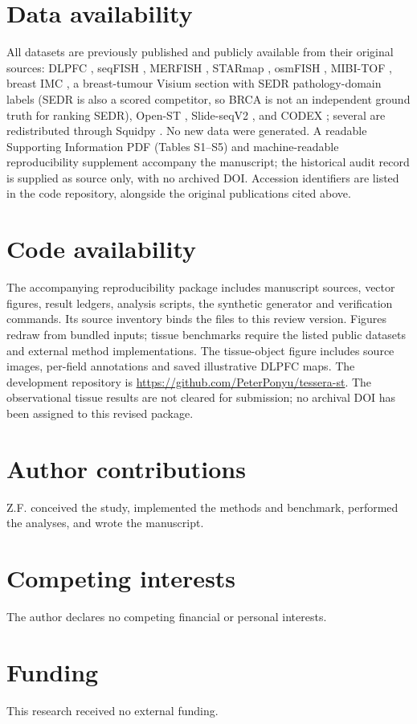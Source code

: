 \documentclass[journal]{IEEEtran}
\begin{document}
\section*{Data availability}
All datasets are previously published and publicly available from their original sources: DLPFC
\citep{maynard2021dlpfc}, seqFISH \citep{lohoff2022seqfish}, MERFISH \citep{moffitt2018merfish}, STARmap
\citep{wang2018starmap}, osmFISH \citep{codeluppi2018osmfish}, MIBI-TOF \citep{hartmann2021scmep}, breast IMC
\citep{jackson2020imc}, a breast-tumour Visium section \citep{tenx2020brca} with SEDR pathology-domain labels
\citep{xu2024sedr} (SEDR is also a scored competitor, so BRCA is not an independent ground truth for
ranking SEDR), Open-ST \citep{schott2024openst}, Slide-seqV2 \citep{stickels2021slideseq}, and
CODEX \citep{goltsev2018codex}; several are redistributed through Squidpy \citep{palla2022squidpy}. No new data were generated. A readable Supporting Information PDF (Tables S1--S5) and machine-readable reproducibility supplement accompany the manuscript;
the historical audit record is supplied as source only, with no archived DOI. Accession identifiers
are listed in the code repository, alongside the original publications cited above.

\section*{Code availability}
The accompanying reproducibility package includes manuscript sources, vector figures, result ledgers, analysis scripts, the synthetic generator and verification commands. Its source inventory binds the files to this review version. Figures redraw from bundled inputs; tissue benchmarks require the listed public datasets and external method implementations. The tissue-object figure includes source images, per-field annotations and saved illustrative DLPFC maps. The development repository is \url{https://github.com/PeterPonyu/tessera-st}. The observational tissue results are not cleared for submission; no archival DOI has been assigned to this revised package.

\section*{Author contributions}
Z.F. conceived the study, implemented the methods and benchmark, performed the analyses, and wrote the
manuscript.

\section*{Competing interests}
The author declares no competing financial or personal interests.

\section*{Funding}
This research received no external funding.

\setlength{\bibsep}{0pt plus 0.2pt}


\end{document}
